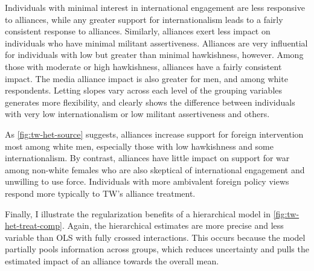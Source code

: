 \documentclass[12pt]{article}
\begin{document}
Individuals with minimal interest in international engagement are less responsive to alliances, while any greater support for internationalism leads to a fairly consistent response to alliances. 
Similarly, alliances exert less impact on individuals who have minimal militant assertiveness. 
Alliances are very influential for individuals with low but greater than minimal hawkishness, however. 
Among those with moderate or high hawkishness, alliances have a fairly consistent impact. 
The media alliance impact is also greater for men, and among white respondents. 
Letting slopes vary across each level of the grouping variables generates more flexibility, and clearly shows the difference between individuals with very low internationalism or low militant assertiveness and others. 


As \autoref{fig:tw-het-source} suggests, alliances increase support for foreign intervention most among white men, especially those with low hawkishness and some internationalism.
By contrast, alliances have little impact on support for war among non-white females who are also skeptical of international engagement and unwilling to use force.
Individuals with more ambivalent foreign policy views respond more typically to TW's alliance treatment. 


Finally, I illustrate the regularization benefits of a hierarchical model in \autoref{fig:tw-het-treat-comp}. 
Again, the hierarchical estimates are more precise and less variable than OLS with fully crossed interactions. 
This occurs because the model partially pools information across groups, which reduces uncertainty and pulls the estimated impact of an alliance towards the overall mean.
\end{document}
